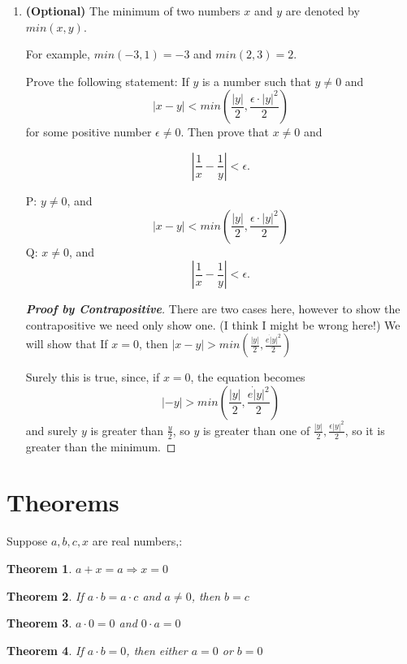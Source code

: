 \documentclass{article} %
\theoremstyle{plain}
\newtheorem{theorem}{Theorem}
\theoremstyle{case}
\begin{document}
\begin{enumerate}[label={\fbox{\textbf{Exercise \#\arabic* :}}}]
\newpage
\item \textbf{(Optional)} The minimum of two numbers $x$ and $y$ are
  denoted by $min (x,y)$.

  For example, $min(-3, 1)=-3$ and $min (2,3)=2$.

    Prove the following statement: If $y$ is a number such that $y\neq 0$ and
    \[ |x-y| < min \left(\frac{|y|}{2}, \frac{\epsilon\cdot |y|^2}{2}\right) \]
    for some positive number $\epsilon \neq 0$.
    Then prove that $x\neq 0$ and

    \[ \left|\frac{1}{x}-\frac{1}{y}\right| <\epsilon. \]

    P: $y \neq 0$, and 
    \[ |x-y| < min \left(\frac{|y|}{2}, \frac{\epsilon\cdot |y|^2}{2}\right) \]
    Q: $x \neq 0$, and
    \[ \left|\frac{1}{x}-\frac{1}{y}\right| <\epsilon. \]

      \begin{proof}[\textbf{Proof by Contrapositive}]
        There are two cases here, however to show the contrapositive we
        need only show one.  (I think I might be wrong here!)
        We will show that
            If $x = 0$, then $|x-y| > min(\frac{|y|}{2} , \frac{e\dot |y|^2}{2})$

                Surely this is true, since, if $x = 0$, the equation becomes
                \[ |-y| > min(\frac{|y|}{2} , \frac{e\dot |y|^2}{2}) \]
                and surely $y$ is greater than $\frac{y}{2}$, so $y$
                is greater than one of $\frac{|y|}{2},
                \frac{\epsilon|y|^2}{2}$, so it is greater than the
                minimum.
      \end{proof} 

\end{enumerate}

\newpage
\section*{Theorems}

    Suppose $a, b, c, x$ are real numbers,:
    \begin{theorem}
          $a+x=a \Rightarrow x=0$
    \end{theorem}
    \begin{theorem}
        If $a \cdot b=a \cdot c$ and $a \neq 0$, then $b = c$
    \end{theorem}
    \begin{theorem}
        $a \cdot 0 = 0$ and $0 \cdot a = 0$
    \end{theorem}
    \begin{theorem}
        If $a \cdot b=0$, then either $a=0$ or $b=0$
    \end{theorem}
\end{document}
